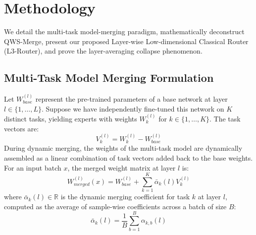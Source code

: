 \section{Methodology}
\label{sec:method}

We detail the multi-task model-merging paradigm, mathematically deconstruct QWS-Merge, present our proposed Layer-wise Low-dimensional Classical Router (L3-Router), and prove the layer-averaging collapse phenomenon.

\subsection{Multi-Task Model Merging Formulation}
Let $W_{base}^{(l)}$ represent the pre-trained parameters of a base network at layer $l \in \{1, \dots, L\}$. Suppose we have independently fine-tuned this network on $K$ distinct tasks, yielding experts with weights $W_k^{(l)}$ for $k \in \{1, \dots, K\}$. The task vectors are:
\begin{equation}
    V_k^{(l)} = W_k^{(l)} - W_{base}^{(l)}
\end{equation}
During dynamic merging, the weights of the multi-task model are dynamically assembled as a linear combination of task vectors added back to the base weights. For an input batch $x$, the merged weight matrix at layer $l$ is:
\begin{equation}
    W_{merged}^{(l)}(x) = W_{base}^{(l)} + \sum_{k=1}^K \bar{\alpha}_k(l) V_k^{(l)}
\end{equation}
where $\bar{\alpha}_k(l) \in \mathbb{R}$ is the dynamic merging coefficient for task $k$ at layer $l$, computed as the average of sample-wise coefficients across a batch of size $B$:
\begin{equation}
    \bar{\alpha}_k(l) = \frac{1}{B} \sum_{b=1}^B \alpha_{k, b}(l)
\end{equation}

